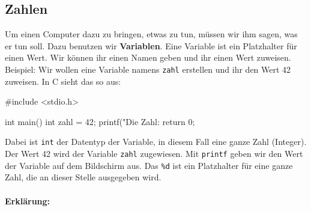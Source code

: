 \subsection{Zahlen}
\label{sec:c:zahlen}

Um einen Computer dazu zu bringen, etwas zu tun, müssen wir ihm sagen, was er tun soll. Dazu benutzen wir \textbf{Variablen}. Eine Variable ist ein Platzhalter für einen Wert. Wir können ihr einen Namen geben und ihr einen Wert zuweisen. Beispiel: Wir wollen eine Variable namens \texttt{zahl} erstellen und ihr den Wert 42 zuweisen. In C sieht das so aus:

\begin{code}
#include <stdio.h>

int main() {
  int zahl = 42;
  printf("Die Zahl: %
  return 0;
}
\end{code}

Dabei ist \texttt{int} der Datentyp der Variable, in diesem Fall eine ganze Zahl (Integer). Der Wert 42 wird der Variable \texttt{zahl} zugewiesen. Mit \texttt{printf} geben wir den Wert der Variable auf dem Bildschirm aus. Das \texttt{\%d} ist ein Platzhalter für eine ganze Zahl, die an dieser Stelle ausgegeben wird.

\paragraph{Erklärung:}

